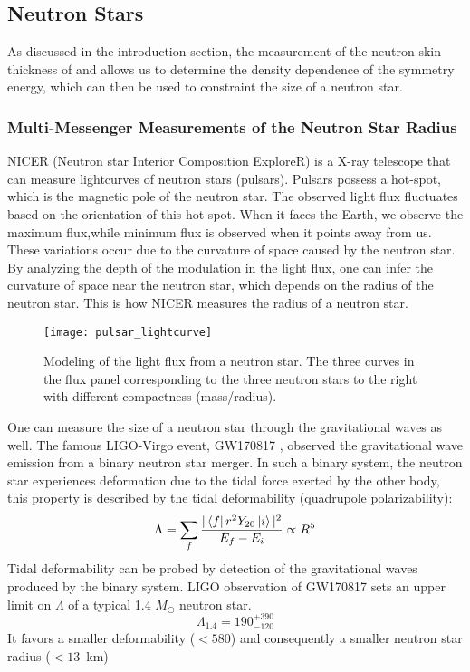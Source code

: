 \subsection{Neutron Stars}
As discussed in the introduction section, the measurement of the neutron skin 
thickness of \Pb and \Ca allows us to determine the density dependence of the symmetry energy,
which can then be used to constraint the size of a neutron star.

\subsubsection{Multi-Messenger Measurements of the Neutron Star Radius}
NICER (Neutron star Interior Composition ExploreR) \cite{NICER} is a X-ray telescope that
can measure lightcurves of neutron stars (pulsars). Pulsars possess a hot-spot, which
is the magnetic pole of the neutron star. The observed light flux fluctuates 
based on the orientation of this hot-spot. When it faces the Earth, we observe the 
maximum flux,while minimum flux is observed when it points away from us. 
These variations occur due to the curvature of space caused by the neutron star. 
By analyzing the depth of the modulation in the light flux, one can infer the curvature of
space near the neutron star, which depends on the radius of the neutron star. 
This is how NICER measures the radius of a neutron star.
\begin{figure}[!h]
    \centering
    \texttt{[image: pulsar\_lightcurve]}
    \caption[Light flux curve]{Modeling of the light flux from a neutron star. The three curves
    in the flux panel corresponding to the three neutron stars to the right
    with different compactness (mass/radius).
    }
\end{figure}

One can measure the size of a neutron star through the gravitational waves as well.
The famous LIGO-Virgo event, GW170817 \cite{PhysRevLett.119.161101}, 
observed the gravitational wave emission from a binary neutron star merger. 
In such a binary system, the neutron star experiences deformation
due to the tidal force exerted by the other body, this property is described by the
tidal deformability (quadrupole polarizability):
\begin{equation}
    \Lambda = \sum_f \frac{|\bra{f}r^2Y_{20}\ket{i}|^2}{E_f - E_i} \propto R^5 
\end{equation}
Tidal deformability can be probed by detection of the gravitational waves produced
by the binary system.
LIGO observation of GW170817 sets an upper limit on $\Lambda$ of a typical 1.4 $M_\odot$
neutron star\cite{PhysRevLett.121.161101}. 
\begin{equation}
    \Lambda_{1.4} = 190^{+390}_{-120}
\end{equation}
It favors a smaller deformability ($<580$) and consequently a smaller neutron star radius ($<13$~km)

